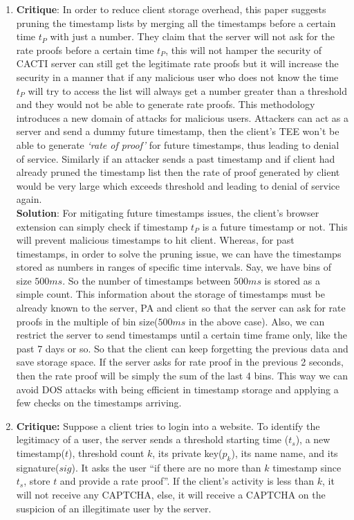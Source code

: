 \begin{enumerate}
	\item \textbf{Critique}: In order to reduce client storage overhead, this paper suggests pruning the timestamp lists by merging all the timestamps before a certain time $t_P$ with just a number. They claim that the server will not ask for the rate proofs before a certain time $t_P$, this will not hamper the security of CACTI server can still get the legitimate rate proofs but it will increase the security in a manner that if any malicious user who does not know the time $t_P$ will try to access the list will always get a number greater than a threshold and they would not be able to generate rate proofs. This methodology introduces a new domain of attacks for malicious users. Attackers can act as a server and send a dummy future timestamp, then the client’s TEE won’t be able to generate \textit{‘rate of proof’} for future timestamps, thus leading to denial of service. Similarly if an attacker sends a past timestamp and if client had already pruned the timestamp list then the rate of proof generated by client would be very large which exceeds threshold and leading to denial of service again. \\

	\textbf{Solution}: For mitigating future timestamps issues, the client’s browser extension can simply check if timestamp $t_P$ is a future timestamp or not. This will prevent malicious timestamps to hit client. Whereas, for past timestamps, in order to solve the pruning issue, we can have the timestamps stored as numbers in ranges of specific time intervals. Say, we have bins of size $500ms$. So the number of timestamps between $500ms$ is stored as a simple count. This information about the storage of timestamps must be already known to the server, PA and client so that the server can ask for rate proofs in the multiple of bin size($500ms$ in the above case). Also, we can restrict the server to send timestamps until a certain time frame only, like the past 7 days or so. So that the client can keep forgetting the previous data and save storage space. If the server asks for rate proof in the previous 2 seconds, then the rate proof will be simply the sum of the last 4 bins. This way we can avoid DOS attacks with being efficient in timestamp storage and applying a few checks on the timestamps arriving.\\

	\item \textbf{Critique:} Suppose a client tries to login into a website. To identify the legitimacy of a user, the server sends a threshold starting time ($t_{s}$), a new timestamp($t$), threshold count $k$, its private key($p_k$), its name name, and its signature($sig$). It asks the user “if there are no more than $k$ timestamp since $t_s$, store $t$ and provide a rate proof”. If the client's activity is less than $k$, it will not receive any CAPTCHA, else, it will receive a CAPTCHA on the suspicion of an illegitimate user by the server.


\end{enumerate}
